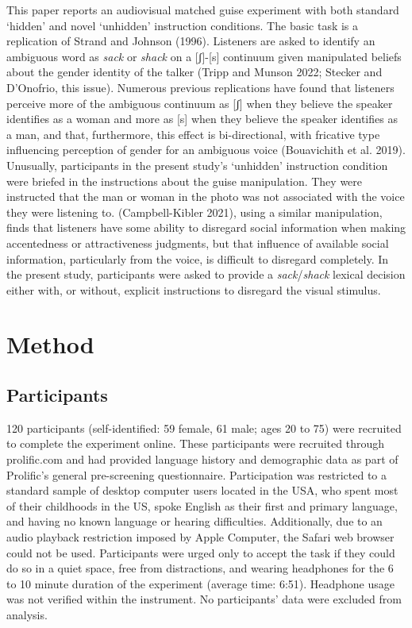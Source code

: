 \documentclass[
  letterpaper,
  DIV=11,
  numbers=noendperiod]{scrartcl}
\begin{document}
This paper reports an audiovisual matched guise experiment with both
standard `hidden' and novel `unhidden' instruction conditions. The basic
task is a replication of Strand and Johnson (1996). Listeners are asked
to identify an ambiguous word as \emph{sack} or \emph{shack} on a
{[}ʃ{]}-{[}s{]} continuum given manipulated beliefs about the gender
identity of the talker (Tripp and Munson 2022; Stecker and D'Onofrio,
this issue). Numerous previous replications have found that listeners
perceive more of the ambiguous continuum as {[}ʃ{]} when they believe
the speaker identifies as a woman and more as {[}s{]} when they believe
the speaker identifies as a man, and that, furthermore, this effect is
bi-directional, with fricative type influencing perception of gender for
an ambiguous voice (Bouavichith et al. 2019). Unusually, participants in
the present study's `unhidden' instruction condition were briefed in the
instructions about the guise manipulation. They were instructed that the
man or woman in the photo was not associated with the voice they were
listening to. (Campbell-Kibler 2021), using a similar manipulation,
finds that listeners have some ability to disregard social information
when making accentedness or attractiveness judgments, but that influence
of available social information, particularly from the voice, is
difficult to disregard completely. In the present study, participants
were asked to provide a \emph{sack}/\emph{shack} lexical decision either
with, or without, explicit instructions to disregard the visual
stimulus.

\section{Method}\label{sec-method}

\subsection{Participants}\label{sec-participants}

120 participants (self-identified: 59 female, 61 male; ages 20 to 75)
were recruited to complete the experiment online. These participants
were recruited through prolific.com and had provided language history
and demographic data as part of Prolific's general pre-screening
questionnaire. Participation was restricted to a standard sample of
desktop computer users located in the USA, who spent most of their
childhoods in the US, spoke English as their first and primary language,
and having no known language or hearing difficulties. Additionally, due
to an audio playback restriction imposed by Apple Computer, the Safari
web browser could not be used. Participants were urged only to accept
the task if they could do so in a quiet space, free from distractions,
and wearing headphones for the 6 to 10 minute duration of the experiment
(average time: 6:51). Headphone usage was not verified within the
instrument. No participants' data were excluded from analysis.
\end{document}
